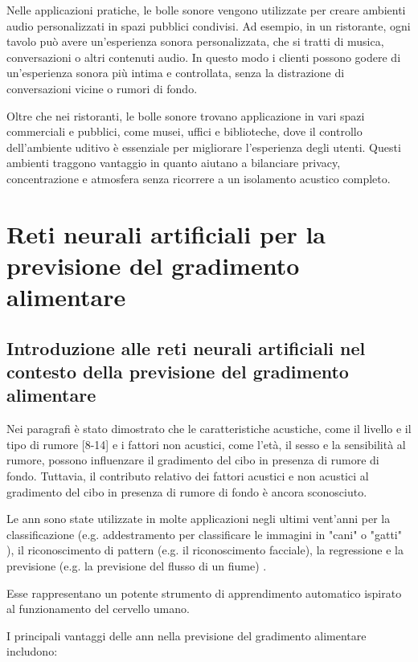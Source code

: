 Nelle applicazioni pratiche, le bolle sonore vengono utilizzate per creare ambienti audio personalizzati in spazi pubblici condivisi. Ad esempio, in un ristorante, ogni tavolo può avere un'esperienza sonora personalizzata, che si tratti di musica, conversazioni o altri contenuti audio. In questo modo i clienti possono godere di un'esperienza sonora più intima e controllata, senza la distrazione di conversazioni vicine o rumori di fondo. 

Oltre che nei ristoranti, le bolle sonore trovano applicazione in vari spazi commerciali e pubblici, come musei, uffici e biblioteche, dove il controllo dell'ambiente uditivo è essenziale per migliorare l'esperienza degli utenti. Questi ambienti traggono vantaggio in quanto aiutano a bilanciare privacy, concentrazione e atmosfera senza ricorrere a un isolamento acustico completo.~\cite{cit-multiaudio}

\section{Reti neurali artificiali per la previsione del gradimento alimentare}

\subsection{Introduzione alle reti neurali artificiali nel contesto della previsione del gradimento alimentare}
\noindent

Nei paragrafi è stato dimostrato che le caratteristiche acustiche, come il livello e il tipo di rumore [8-14] e i fattori non acustici, come l'età, il sesso e la sensibilità al rumore, possono influenzare il gradimento del cibo in presenza di rumore di fondo. Tuttavia, il contributo relativo dei fattori acustici e non acustici al gradimento del cibo in presenza di rumore di fondo è ancora sconosciuto.

Le \gls{ann} sono state utilizzate in molte applicazioni negli ultimi vent'anni per la classificazione (e.g. addestramento per classificare le immagini in "cani" o "gatti" ), il riconoscimento di pattern (e.g. il riconoscimento facciale), la regressione e la previsione (e.g. la previsione del flusso di un fiume) \cite{rezaeianzadeh2014flood}.

Esse rappresentano un potente strumento di apprendimento automatico ispirato al funzionamento del cervello umano. 

I principali vantaggi delle \gls{ann} nella previsione del gradimento alimentare includono:

